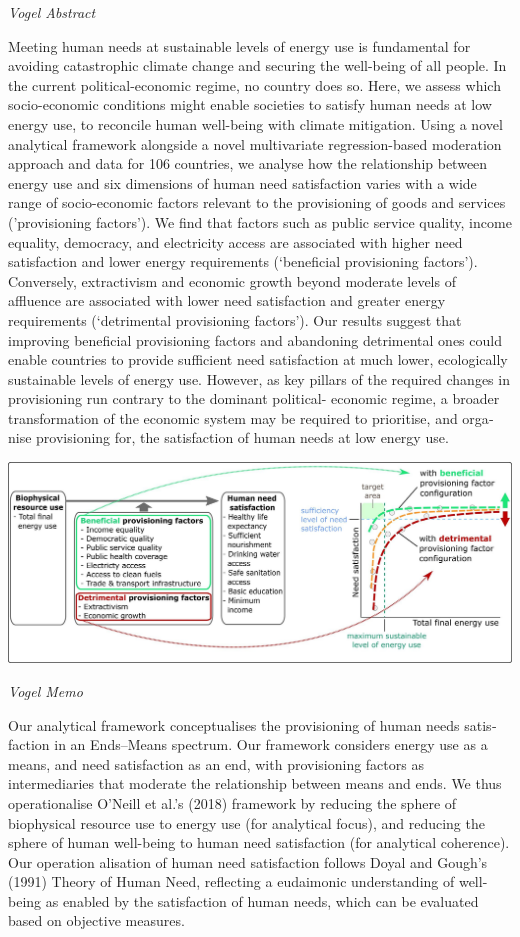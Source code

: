 \documentclass[
]{book}
\begin{document}
\emph{Vogel Abstract}

Meeting human needs at sustainable levels of energy use is fundamental for avoiding catastrophic climate change
and securing the well-being of all people. In the current political-economic regime, no country does so. Here, we
assess which socio-economic conditions might enable societies to satisfy human needs at low energy use, to
reconcile human well-being with climate mitigation.
Using a novel analytical framework alongside a novel multivariate regression-based moderation approach and
data for 106 countries, we analyse how the relationship between energy use and six dimensions of human need
satisfaction varies with a wide range of socio-economic factors relevant to the provisioning of goods and services
('provisioning factors'). We find that factors such as public service quality, income equality, democracy, and
electricity access are associated with higher need satisfaction and lower energy requirements (`beneficial
provisioning factors'). Conversely, extractivism and economic growth beyond moderate levels of affluence are
associated with lower need satisfaction and greater energy requirements (`detrimental provisioning factors'). Our
results suggest that improving beneficial provisioning factors and abandoning detrimental ones could enable
countries to provide sufficient need satisfaction at much lower, ecologically sustainable levels of energy use.
However, as key pillars of the required changes in provisioning run contrary to the dominant political-
economic regime, a broader transformation of the economic system may be required to prioritise, and orga­
nise provisioning for, the satisfaction of human needs at low energy use.

\includegraphics{fig/Vogel_framework.jpg}

\emph{Vogel Memo}

Our analytical framework conceptualises the provisioning of human needs satis­
faction in an Ends--Means spectrum. Our framework
considers energy use as a means, and need satisfaction as an end, with
provisioning factors as intermediaries that moderate the relationship
between means and ends. We thus operationalise O'Neill et al.'s (2018)
framework by reducing the sphere of biophysical resource use to energy
use (for analytical focus), and reducing the sphere of human well-being
to human need satisfaction (for analytical coherence). Our operation­
alisation of human need satisfaction follows Doyal and Gough's (1991)
Theory of Human Need, reflecting a eudaimonic understanding of well-
being as enabled by the satisfaction of human needs, which can be
evaluated based on objective measures.
\end{document}
